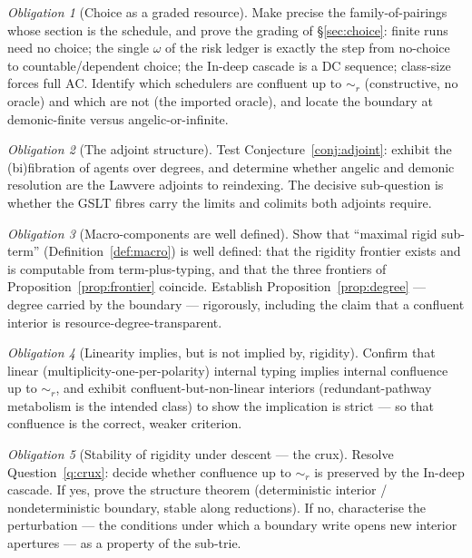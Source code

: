 \documentclass[11pt]{article}
\theoremstyle{definition}
\theoremstyle{plain}
\theoremstyle{remark}
\newtheorem{obligation}{Obligation}
\newcommand{\rbisim}{\sim_{r}}
\begin{document}
\begin{obligation}[Choice as a graded resource]
Make precise the family-of-pairings whose section is the schedule, and prove the
grading of \S\ref{sec:choice}: finite runs need no choice; the single $\omega$ of
the risk ledger is exactly the step from no-choice to countable/dependent choice;
the In-deep cascade is a $\mathrm{DC}$ sequence; class-size forces full
$\mathrm{AC}$. Identify which schedulers are confluent up to $\rbisim$
(constructive, no oracle) and which are not (the imported oracle), and locate the
boundary at demonic-finite versus angelic-or-infinite.
\end{obligation}

\begin{obligation}[The adjoint structure]
Test Conjecture~\ref{conj:adjoint}: exhibit the (bi)fibration of agents over
degrees, and determine whether angelic and demonic resolution are the Lawvere
adjoints to reindexing. The decisive sub-question is whether the GSLT fibres carry
the limits and colimits both adjoints require.
\end{obligation}

\begin{obligation}[Macro-components are well defined]
Show that ``maximal rigid sub-term'' (Definition~\ref{def:macro}) is well defined:
that the rigidity frontier exists and is computable from term-plus-typing, and that
the three frontiers of Proposition~\ref{prop:frontier} coincide. Establish
Proposition~\ref{prop:degree} --- degree carried by the boundary --- rigorously,
including the claim that a confluent interior is resource-degree-transparent.
\end{obligation}

\begin{obligation}[Linearity implies, but is not implied by, rigidity]
Confirm that linear (multiplicity-one-per-polarity) internal typing implies
internal confluence up to $\rbisim$, and exhibit confluent-but-non-linear interiors
(redundant-pathway metabolism is the intended class) to show the implication is
strict --- so that confluence is the correct, weaker criterion.
\end{obligation}

\begin{obligation}[Stability of rigidity under descent --- the crux]
Resolve Question~\ref{q:crux}: decide whether confluence up to $\rbisim$ is
preserved by the In-deep cascade. If yes, prove the structure theorem
(deterministic interior / nondeterministic boundary, stable along reductions). If
no, characterise the perturbation --- the conditions under which a boundary write
opens new interior apertures --- as a property of the sub-trie.
\end{obligation}
\end{document}
